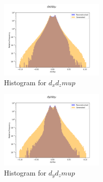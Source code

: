 \documentclass[EPJ,twocolumn]{webofc}
\begin{document}









\begin{figure}[H]
\centering
\includegraphics[width=0.45\textwidth]{graphs/incl_dx_dz_mu.png}
    \caption{Histogram for $d_xd_zmup$}
    \label{fig:incl_Angle_mu_1}
\end{figure}

\begin{figure}[H]
\centering
    \includegraphics[width=0.45\textwidth]{graphs/incl_dy_dz_mu.png}
    \caption{Histogram for $d_yd_zmup$}
    \label{fig:incl_Angle_mu}
\end{figure}
\end{document}
